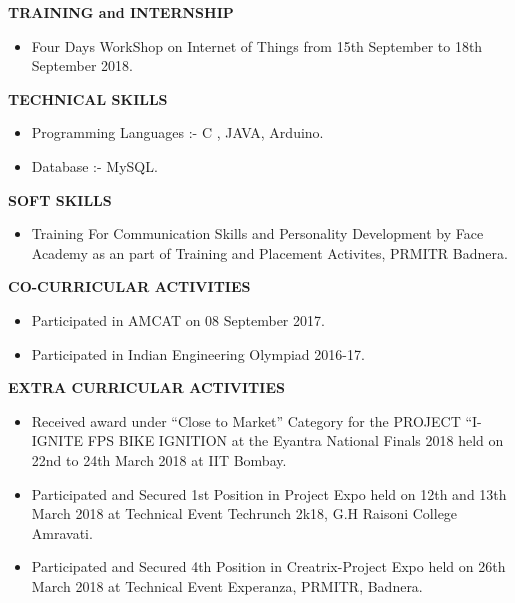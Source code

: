 \documentclass[a4paper,20pt]{article}
\newcommand{\lsep}{-0.5cm}
\begin{document}
\textbf{\large{TRAINING and INTERNSHIP }} \\[\lsep]
\begin{itemize}

\item \noindent Four Days WorkShop on Internet of Things from 15th September to 18th September 2018.

\end{itemize}




\textbf{\large{TECHNICAL SKILLS}} \\[\lsep]

\begin{itemize}
	\item \noindent Programming Languages :- C , JAVA, Arduino. 
	\item \noindent Database :- MySQL.
		
\end{itemize}

\textbf{\large{SOFT SKILLS}} \\[\lsep]
\begin{itemize}
	\item \noindent Training For Communication Skills and Personality Development by Face Academy as an part of Training and Placement Activites, PRMITR Badnera.
	
\end{itemize}
\newpage
\textbf{\large{CO-CURRICULAR ACTIVITIES }} \\[\lsep]
\begin{itemize}
	\item \noindent Participated in AMCAT on 08 September 2017.
	\item \noindent Participated in Indian Engineering Olympiad 2016-17.
	
\end{itemize}

\textbf{\large{EXTRA CURRICULAR ACTIVITIES }} \\[\lsep]
\begin{itemize}
	\item \noindent Received award under “Close to Market” Category for the PROJECT “I-IGNITE FPS BIKE IGNITION at the Eyantra National Finals 2018 held on 22nd to 24th March 2018 at IIT Bombay. 
	\item \noindent Participated and Secured 1st Position in Project Expo held on 12th and 13th March 2018 at Technical Event Techrunch 2k18, G.H Raisoni College Amravati. 
	\item \noindent Participated and Secured 4th Position in Creatrix-Project Expo held on 26th March 2018 at Technical Event Experanza, PRMITR, Badnera.
	
\end{itemize}
\end{document}
